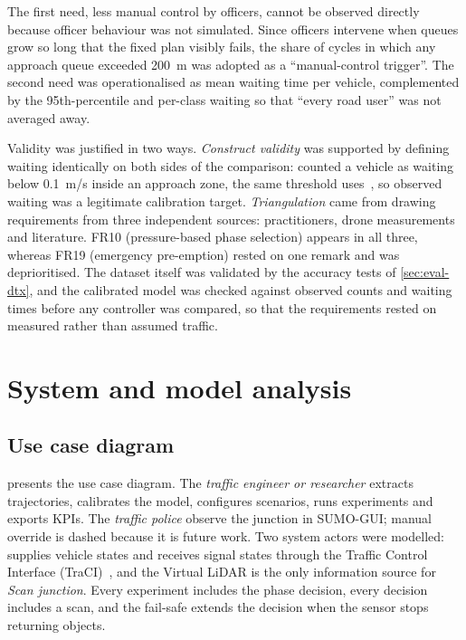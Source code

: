 The first need, less manual control by officers, cannot be observed directly because officer behaviour was not simulated. Since officers intervene when queues grow so long that the fixed plan visibly fails, the share of cycles in which any approach queue exceeded 200~m was adopted as a ``manual-control trigger''. The second need was operationalised as mean waiting time per vehicle, complemented by the 95th-percentile and per-class waiting so that ``every road user'' was not averaged away.

Validity was justified in two ways. \emph{Construct validity} was supported by defining waiting identically on both sides of the comparison: \dtx{} counted a vehicle as waiting below 0.1~m/s inside an approach zone, the same threshold \sumo{} uses~\cite{lopez2018sumo}, so observed waiting was a legitimate calibration target. \emph{Triangulation} came from drawing requirements from three independent sources: practitioners, drone measurements and literature. FR10 (pressure-based phase selection) appears in all three, whereas FR19 (emergency pre-emption) rested on one remark and was deprioritised. The dataset itself was validated by the accuracy tests of \cref{sec:eval-dtx}, and the calibrated model was checked against observed counts and waiting times before any controller was compared, so that the requirements rested on measured rather than assumed traffic.

\section{System and model analysis}\label{sec:srs-analysis}

\subsection{Use case diagram}\label{sec:srs-usecase}

 presents the use case diagram. The \emph{traffic engineer or researcher} extracts trajectories, calibrates the model, configures scenarios, runs experiments and exports KPIs. The \emph{traffic police} observe the junction in SUMO-GUI; manual override is dashed because it is future work. Two system actors were modelled: \sumo{} supplies vehicle states and receives signal states through the Traffic Control Interface (TraCI)~\cite{wegener2008traci}, and the Virtual LiDAR is the only information source for \emph{Scan junction}. Every experiment includes the phase decision, every decision includes a scan, and the fail-safe extends the decision when the sensor stops returning objects.

